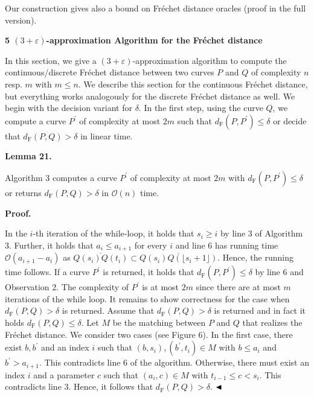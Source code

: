 \documentclass[10pt,a4paper]{article}
\begin{document}
Our construction gives also a bound on Fréchet distance oracles (proof in the full version).
\par
\par
\par\medskip\noindent\textbf{5 $(3+\varepsilon)$-approximation Algorithm for the Fréchet distance}\par
In this section, we give a $(3+\varepsilon)$-approximation algorithm to compute the continuous/discrete Fréchet distance between two curves $P$ and $Q$ of complexity $n$ resp. $m$ with $m\leq n$. We describe this section for the continuous Fréchet distance, but everything works analogously for the discrete Fréchet distance as well. We begin with the decision variant for $\delta$. In the first step, using the curve $Q$, we compute a curve $P^{\prime}$ of complexity at most $2m$ such that $d_{\text{F}}(P,P^{\prime})\leq\delta$ or decide that $d_{\text{F}}(P,Q)>\delta$ in linear time.
\par
\par
\par\medskip\noindent\textbf{Lemma 21.}\par
Algorithm 3 computes a curve $P^{\prime}$ of complexity at most $2m$ with $d_{\text{F}}(P,P^{\prime})\leq\delta$ or returns $d_{\text{F}}(P,Q)>\delta$ in $\mathcal{O}(n)$ time.
\par
\par
\par
\par\medskip\noindent\textbf{Proof.}\par
In the $i$-th iteration of the while-loop, it holds that $s_{i}\geq i$ by line 3 of Algorithm 3. Further, it holds that $a_{i}\leq a_{i+1}$ for every $i$ and line 6 has running time $\mathcal{O}(a_{i+1}-a_{i})$ as $\overline{Q(s_{i})Q(t_{i})}\subset\overline{Q(s_{i})Q(\lfloor s_{i}+1\rfloor)}$. Hence, the running time follows. If a curve $P^{\prime}$ is returned, it holds that $d_{\text{F}}(P,P^{\prime})\leq\delta$ by line 6 and Observation 2. The complexity of $P^{\prime}$ is at most $2m$ since there are at most $m$ iterations of the while loop. It remains to show correctness for the case when $d_{\text{F}}(P,Q)>\delta$ is returned. Assume that $d_{\text{F}}(P,Q)>\delta$ is returned and in fact it holds $d_{\text{F}}(P,Q)\leq\delta$. Let $M$ be the matching between $P$ and $Q$ that realizes the Fréchet distance. We consider two cases (see Figure 6). In the first case, there exist $b,b^{\prime}$ and an index $i$ such that $(b,s_{i}),(b^{\prime},t_{i})\in M$ with $b\leq a_{i}$ and $b^{\prime}>a_{i+1}$. This contradicts line 6 of the algorithm. Otherwise, there must exist an index $i$ and a parameter $c$ such that $(a_{i},c)\in M$ with $t_{i-1}\leq c<s_{i}$. This contradicts line 3. Hence, it follows that $d_{\text{F}}(P,Q)>\delta$. $\hfill\blacktriangleleft$
\end{document}
